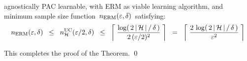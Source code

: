 \begin{enumerate}
	agnostically PAC learnable, with ERM as viable learning algorithm, and
	minimum sample size function \,$n_{\textnormal{ERM}}(\varepsilon,\delta)$\,
	satisfying:
	\begin{equation*}
	n_{\textnormal{ERM}}(\varepsilon,\delta)
	\;\; \leq \;\;
		n^{\textnormal{UC}}_{\mathcal{H}}(\varepsilon/2,\delta)
	\;\; \leq \;\;
		\left\lceil\;
			\dfrac{
				\log\!\left(\,2\,\vert\,\mathcal{H}\,\vert\,/\,\delta\,\right)
				}{
				2\,(\varepsilon/2)^{2}
				}
			\;\right\rceil
	\;\; = \;\;
		\left\lceil\;
			\dfrac{
				2\,\log\!\left(\,2\,\vert\,\mathcal{H}\,\vert\,/\,\delta\,\right)
				}{
				\varepsilon^{2}
				}
			\;\right\rceil
	\end{equation*}
\end{enumerate}
This completes the proof of the Theorem.
\qed



